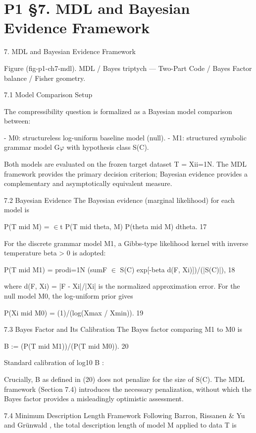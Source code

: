 
\section{P1 §7. MDL and Bayesian Evidence Framework}

7. MDL and Bayesian Evidence Framework

    Figure (fig-p1-ch7-mdl). MDL / Bayes triptych --- Two-Part Code / Bayes Factor balance / Fisher
                                              geometry.

  7.1 Model Comparison Setup

  The compressibility question is formalized as a Bayesian model comparison between:

  - M0: structureless log-uniform baseline model (null).
  - M1: structured symbolic grammar model G$\varphi$ with hypothesis class S(C).

  Both models are evaluated on the frozen target dataset T = {Xi}i=1N. The MDL
  framework \citep{barron1998,grunwald2007} provides the primary
  decision criterion; Bayesian evidence provides a complementary and asymptotically
  equivalent measure.

  7.2 Bayesian Evidence
  The Bayesian evidence (marginal likelihood) for each model is

  P(T mid M) = $\in$t P(T mid theta, M) P(theta mid M) dtheta. 17

  For the discrete grammar model M1, a Gibbs-type likelihood kernel with inverse
  temperature beta > 0 is adopted:

  P(T mid M1) = prodi=1N (sumF $\in$ S(C) exp[-beta d(F, Xi)])/(|S(C)|), 18

  where d(F, Xi) = |F - Xi|/|Xi| is the normalized approximation error. For the null model
  M0, the log-uniform prior gives

  P(Xi mid M0) = (1)/(log(Xmax / Xmin)). 19

  7.3 Bayes Factor and Its Calibration
  The Bayes factor comparing M1 to M0 is

  B := (P(T mid M1))/(P(T mid M0)). 20

  Standard calibration of log10 B \citep{grunwald2007}:

  Crucially, B as defined in (20) does not penalize for the size of S(C). The MDL
  framework (Section 7.4) introduces the necessary penalization, without which the
  Bayes factor provides a misleadingly optimistic assessment.

  7.4 Minimum Description Length Framework
  Following Barron, Rissanen \& Yu \citep{barron1998} and Grünwald \citep{grunwald2007}, the total description
  length of model M applied to data T is

